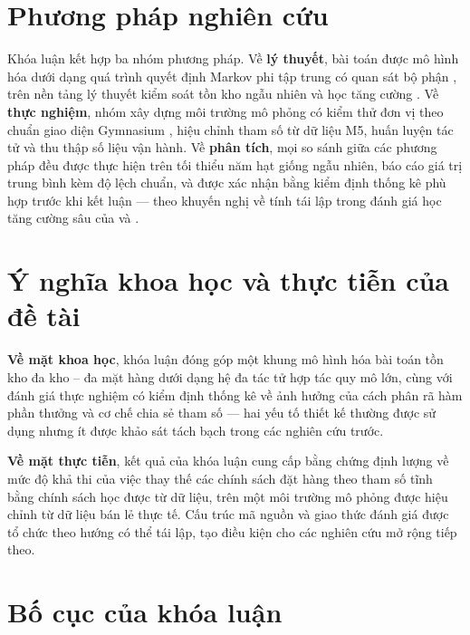 \section{Phương pháp nghiên cứu}
\label{sec:phuongphap}

Khóa luận kết hợp ba nhóm phương pháp. Về \textbf{lý thuyết}, bài toán được mô
hình hóa dưới dạng quá trình quyết định Markov phi tập trung có quan sát bộ
phận \parencite{bernstein2002, oliehoek2016}, trên nền tảng lý thuyết kiểm soát
tồn kho ngẫu nhiên \parencite{zipkin2000} và học tăng cường
\parencite{puterman1994, sutton2018}. Về \textbf{thực nghiệm}, nhóm xây dựng
môi trường mô phỏng có kiểm thử đơn vị theo chuẩn giao diện Gymnasium
\parencite{brockman2016gym, towers2024gymnasium}, hiệu chỉnh tham số từ dữ liệu
M5, huấn luyện tác tử và thu thập số liệu vận hành. Về \textbf{phân tích}, mọi
so sánh giữa các phương pháp đều được thực hiện trên tối thiểu năm hạt giống
ngẫu nhiên, báo cáo giá trị trung bình kèm độ lệch chuẩn, và được xác nhận bằng
kiểm định thống kê phù hợp trước khi kết luận --- theo khuyến nghị về tính tái
lập trong đánh giá học tăng cường sâu của \textcite{henderson2018} và
\textcite{agarwal2021}.

\section{Ý nghĩa khoa học và thực tiễn của đề tài}
\label{sec:ynghia}

\textbf{Về mặt khoa học}, khóa luận đóng góp một khung mô hình hóa bài toán tồn
kho đa kho -- đa mặt hàng dưới dạng hệ đa tác tử hợp tác quy mô lớn, cùng với
đánh giá thực nghiệm có kiểm định thống kê về ảnh hưởng của cách phân rã hàm
phần thưởng và cơ chế chia sẻ tham số --- hai yếu tố thiết kế thường được sử
dụng nhưng ít được khảo sát tách bạch trong các nghiên cứu trước.

\textbf{Về mặt thực tiễn}, kết quả của khóa luận cung cấp bằng chứng định lượng
về mức độ khả thi của việc thay thế các chính sách đặt hàng theo tham số tĩnh
bằng chính sách học được từ dữ liệu, trên một môi trường mô phỏng được hiệu
chỉnh từ dữ liệu bán lẻ thực tế. Cấu trúc mã nguồn và giao thức đánh giá được
tổ chức theo hướng có thể tái lập, tạo điều kiện cho các nghiên cứu mở rộng
tiếp theo.

\section{Bố cục của khóa luận}
\label{sec:bocuc}

